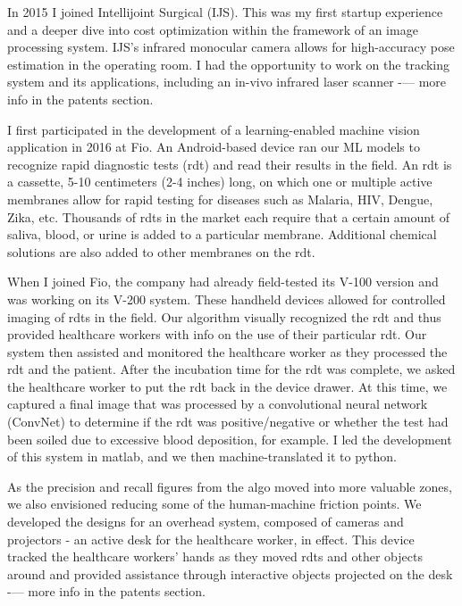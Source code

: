 \osspacing
In 2015 I joined Intellijoint Surgical (IJS). This was my first startup experience and a deeper dive into cost optimization within the framework of an image processing system. IJS’s infrared monocular camera allows for high-accuracy pose estimation in the operating room. I had the opportunity to work on the tracking system and its applications, including an in-vivo infrared laser scanner -— more info in the patents section.

\osspacing
I first participated in the development of a learning-enabled machine vision application in 2016 at Fio. An Android-based device ran our ML models to recognize rapid diagnostic tests (rdt) and read their results in the field. An rdt is a cassette, 5-10 centimeters (2-4 inches) long, on which one or multiple active membranes allow for rapid testing for diseases such as Malaria, HIV, Dengue, Zika, etc. Thousands of rdts in the market each require that a certain amount of saliva, blood, or urine is added to a particular membrane. Additional chemical solutions are also added to other membranes on the rdt.

\osspacing
When I joined Fio, the company had already field-tested its V-100 version and was working on its V-200 system. These handheld devices allowed for controlled imaging of rdts in the field. Our algorithm visually recognized the rdt and thus provided healthcare workers with info on the use of their particular rdt. Our system then assisted and monitored the healthcare worker as they processed the rdt and the patient. After the incubation time for the rdt was complete, we asked the healthcare worker to put the rdt back in the device drawer. At this time, we captured a final image that was processed by a convolutional neural network (ConvNet) to determine if the rdt was positive/negative or whether the test had been soiled due to excessive blood deposition, for example. I led the development of this system in matlab, and we then machine-translated it to python.
 
\osspacing
As the precision and recall figures from the algo moved into more valuable zones, we also envisioned reducing some of the human-machine friction points. We developed the designs for an overhead system, composed of cameras and projectors - an active desk for the healthcare worker, in effect. This device tracked the healthcare workers' hands as they moved rdts and other objects around and provided assistance through interactive objects projected on the desk -— more info in the patents section.

